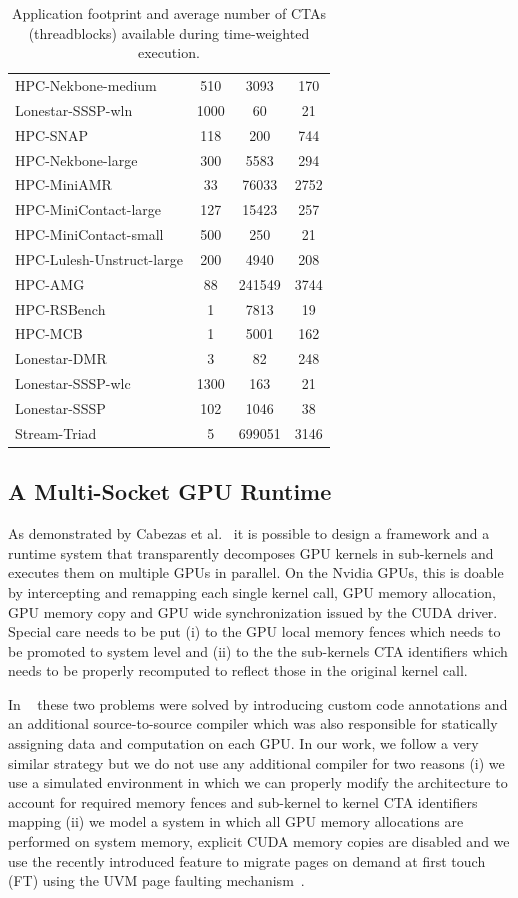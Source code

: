 \begin{table}[t]
\begin{small}
\begin{tabular}{lccc}
HPC-Nekbone-medium & 510 & 3093 & 170 \\
Lonestar-SSSP-wln & 1000 & 60 & 21 \\
HPC-SNAP & 118 & 200 & 744 \\
HPC-Nekbone-large & 300 & 5583 & 294 \\
HPC-MiniAMR & 33 & 76033 & 2752 \\
HPC-MiniContact-large & 127 & 15423 & 257 \\
HPC-MiniContact-small & 500 & 250 & 21 \\
HPC-Lulesh-Unstruct-large & 200 & 4940 & 208 \\
HPC-AMG & 88 & 241549 & 3744 \\
HPC-RSBench & 1 & 7813 & 19 \\
HPC-MCB & 1 & 5001 & 162 \\
Lonestar-DMR & 3 & 82 & 248 \\
Lonestar-SSSP-wlc & 1300 & 163 & 21 \\
Lonestar-SSSP & 102 & 1046 & 38 \\
Stream-Triad & 5 & 699051 & 3146 \\
\toprule
\end{tabular}
\caption{Application footprint and average number of CTAs (threadblocks) available during time-weighted execution.}
\label{tab:numctas}
\end{small}
\end{table}

\subsection{A Multi-Socket GPU Runtime}

As demonstrated by Cabezas et al.~\cite{Cabezas2015} it is possible to design 
a framework and a runtime system that transparently decomposes GPU kernels in 
sub-kernels and executes them on multiple GPUs in parallel. On the Nvidia 
GPUs, this is doable by intercepting and remapping each single kernel call, 
GPU memory allocation, GPU memory copy and GPU wide synchronization issued by 
the CUDA driver. Special care needs to be put (i) to the GPU local memory 
fences which needs to be promoted to system level and (ii) to the the 
sub-kernels CTA identifiers which needs to be properly recomputed to 
reflect those in the original kernel call. 
 
In ~\cite{Cabezas2015} these two problems were solved by introducing custom 
code annotations and an additional source-to-source compiler which was also 
responsible for statically assigning data and computation on each GPU. In our 
work, we follow a very similar strategy but we do not use any additional 
compiler for two reasons (i) we use a simulated environment in which 
we can properly modify the architecture to account for required memory fences 
and sub-kernel to kernel CTA identifiers mapping (ii) we model a system in 
which all GPU memory allocations are performed on system memory, explicit 
CUDA memory copies are disabled and we use the recently introduced feature to 
migrate pages on demand at first touch (FT) using the UVM page faulting 
mechanism~\cite{P100}. 


